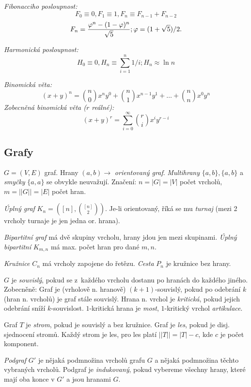 
{\it Fibonacciho posloupnost:}
$$F_0 \equiv 0, F_1 \equiv 1, F_n \equiv F_{n-1} + F_{n-2}$$
$$F_n = {\varphi^n - (1-\varphi)^n \over \sqrt{5}}; \varphi = (1+\sqrt{5})/2.$$

{\it Harmonická posloupnost:}
$$H_0 \equiv 0, H_n \equiv \sum_{i=1}^n 1/i; H_n \approx \ln n$$

{\it Binomická věta:}
$$(x+y)^n = {n \choose 0}x^n y^0 + {n \choose 1}x^{n-1} y^1 + \dots + {n \choose n}x^0 y^n$$
{\it Zobecněná binomická věta ($r$ reálné):}
$$(x+y)^r = \sum_{i=0}^{\infty} {r \choose i} x^{i}y^{r-i} $$

\subsection{Grafy}

$G = (V,E)$ graf. Hrany $(a,b) \rightarrow$ {\it orientovaný graf}.
{\it Multihrany} $\{a,b\},\{a,b\}$ a {\it smyčky} $\{a,a\}$ se obvykle neuvažují.
Značení: $n = |G| = |V|$ počet vrcholů, $m = ||G|| = |E|$ počet hran.

{\it Úplný graf} $K_n = ([n],{[n] \choose 2})$. Je-li orientovaný, říká
se mu {\it turnaj} (mezi 2 vrcholy turnaje je jen jedna or. hrana).

{\it Bipartitní graf} má dvě skupiny vrcholu, hrany jdou jen mezi skupinami.
{\it Úplný bipartitní} $K_{m,n}$ má max. počet hran pro dané $m,n$.

{\it Kružnice} $C_n$ má vrcholy zapojene do řetězu. {\it Cesta} $P_n$
je kružnice bez hrany.

$G$ je {\it souvislý}, pokud se z~každého vrcholu dostanu po hranách do každého
jiného. Zobecněně: Graf je (vrholově n. hranově) $(k+1)$-souvislý, pokud po odebrání
$k$ (hran n. vrcholů) je graf stále souvislý. Hrana n. vrchol je {\it kritická}, pokud jejich
odebrání sníží $k$-souvislost. $1$-kritická hrana je {\it most}, $1$-kritický vrchol
{\it artikulace}.

Graf $T$ je {\it strom}, pokud je souvislý a bez kružnice. Graf je {\it les}, pokud je
disj. sjednocení stromů. Každý strom je les, pro les platí $||T|| = |T| -c$, kde $c$
je počet komponent.

{\it Podgraf} $G'$ je nějaká podmnožina vrcholů grafu $G$ a nějaká podmnožina
těchto vybraných vrcholů. Podgraf je {\it indukovaný}, pokud vybereme všechny hrany,
které mají oba konce v $G'$ a jsou hranami $G$.


